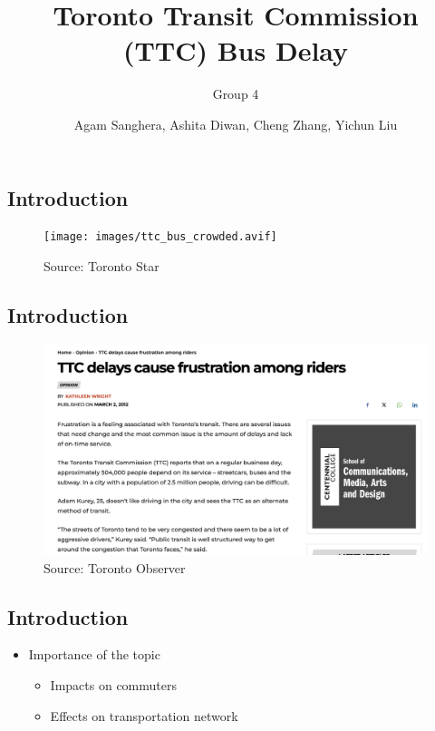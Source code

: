 \documentclass[
  letterpaper,
  DIV=11,
  numbers=noendperiod]{scrartcl}
\title{Toronto Transit Commission (TTC) Bus Delay}
\subtitle{Group 4}
\author{Agam Sanghera, Ashita Diwan, Cheng Zhang, Yichun Liu}
\date{}
\providecommand{\tightlist}{%
  \setlength{\itemsep}{0pt}\setlength{\parskip}{0pt}}\usepackage{longtable,booktabs,array}
\begin{document}
\maketitle


\subsection{Introduction}\label{introduction}

\begin{figure}[H]

{\centering \texttt{[image: images/ttc\_bus\_crowded.avif]}

}

\caption{Source: Toronto Star}

\end{figure}%

\subsection{Introduction}\label{introduction-1}

\begin{figure}[H]

{\centering \includegraphics{images/ttc_bus_delay.png}

}

\caption{Source: Toronto Observer}

\end{figure}%

\subsection{Introduction}\label{introduction-2}

\begin{itemize}
\tightlist
\item
  Importance of the topic

  \begin{itemize}
  \tightlist
  \item
    Impacts on commuters
  \item
    Effects on transportation network
  \end{itemize}
\end{itemize}
\end{document}
